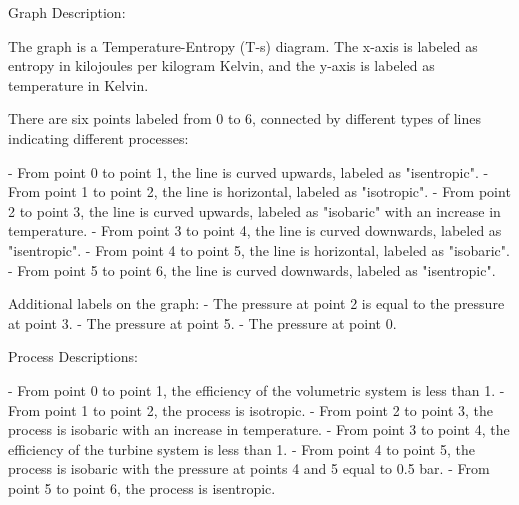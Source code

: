 Graph Description:

The graph is a Temperature-Entropy (T-s) diagram. The x-axis is labeled as entropy in kilojoules per kilogram Kelvin, and the y-axis is labeled as temperature in Kelvin.

There are six points labeled from 0 to 6, connected by different types of lines indicating different processes:

- From point 0 to point 1, the line is curved upwards, labeled as "isentropic".
- From point 1 to point 2, the line is horizontal, labeled as "isotropic".
- From point 2 to point 3, the line is curved upwards, labeled as "isobaric" with an increase in temperature.
- From point 3 to point 4, the line is curved downwards, labeled as "isentropic".
- From point 4 to point 5, the line is horizontal, labeled as "isobaric".
- From point 5 to point 6, the line is curved downwards, labeled as "isentropic".

Additional labels on the graph:
- The pressure at point 2 is equal to the pressure at point 3.
- The pressure at point 5.
- The pressure at point 0.

Process Descriptions:

- From point 0 to point 1, the efficiency of the volumetric system is less than 1.
- From point 1 to point 2, the process is isotropic.
- From point 2 to point 3, the process is isobaric with an increase in temperature.
- From point 3 to point 4, the efficiency of the turbine system is less than 1.
- From point 4 to point 5, the process is isobaric with the pressure at points 4 and 5 equal to 0.5 bar.
- From point 5 to point 6, the process is isentropic.